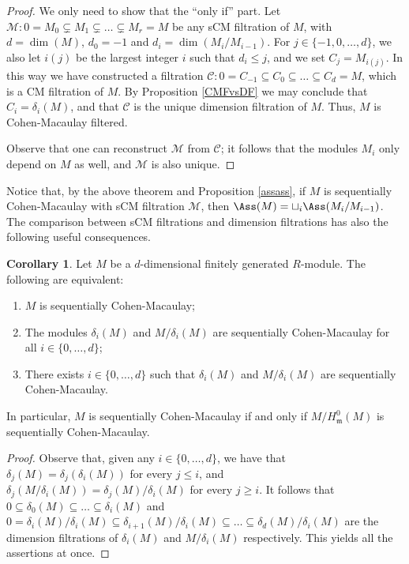 \documentclass[12pt]{amsart}
\theoremstyle{definition}
\newtheorem{corollary}[theorem]{Corollary}
\theoremstyle{definition}
\def\frk{\mathfrak}               %
\def\mm{{\frk m}}
\renewcommand{\leq}{\leqslant}
\renewcommand{\geq}{\geqslant}
\begin{document}
\begin{proof}
 We only need to show that the ``only if'' part.
   Let $\mathcal{M}: 0 = M_0 \subsetneq M_1 \subsetneq \ldots \subsetneq M_r=M$ be any sCM filtration of $M$, with $d=\dim(M)$, $d_0=-1$ and $d_i = \dim(M_i/M_{i-1})$. For $j \in \{-1, 0,\ldots, d\}$,  we also let $i(j)$ be the largest integer $i$ such that $d_{i} \leq j$, and we set $C_j=M_{i(j)}$. In this way we have constructed a filtration  $\mathcal{C}:0=C_{-1} \subseteq C_0 \subseteq \ldots \subseteq C_d=M$, which  is a CM filtration of $M$. By Proposition \ref{CMFvsDF} we may conclude that $C_i = \delta_i(M)$, and that $\mathcal{C}$ is the unique dimension filtration of $M$. Thus,  $M$ is Cohen-Macaulay filtered.

Observe that  one can reconstruct $\mathcal{M}$ from  $\mathcal{C}$; it follows that the modules $M_i$ only depend on $M$ as well, and $\mathcal{M}$ is also unique.
\end{proof}

\noindent Notice that, by the above theorem and  Proposition \ref{assass}, if $M$ is sequentially Cohen-Macaulay with sCM filtration $\mathcal{M}$, then $\Ass(M)=\sqcup_i \Ass(M_i/M_{i-1})$.  The comparison between sCM filtrations and dimension filtrations has also the following useful consequences. 

\begin{corollary} \label{coroll H0}
Let $M$ be a $d$-dimensional finitely generated $R$-module. The following are equivalent:
\begin{enumerate}[(1)]
\item $M$ is sequentially Cohen-Macaulay;
\item The modules $\delta_i(M)$ and $M/\delta_i(M)$ are sequentially Cohen-Macaulay for all $i \in \{0,\ldots,d\}$;
\item There exists $i \in \{0,\ldots,d\}$ such that $\delta_i(M)$ and $M/\delta_i(M)$ are sequentially Cohen-Macaulay.
\end{enumerate}

In particular,  $M$ is sequentially Cohen-Macaulay if and only if $M/H^0_\mm(M)$ is sequentially Cohen-Macaulay. 
\end{corollary}
\begin{proof}
Observe that, given  any $i \in \{0,\ldots,d\}$,  we have that $\delta_j(M) = \delta_j(\delta_i(M))$ for every $j \leq i$, and $\delta_j(M/\delta_i(M)) = \delta_j(M)/\delta_i(M)$ for every $j \geq i$. It follows that $0 \subseteq \delta_0(M) \subseteq \ldots \subseteq \delta_i(M)$ and $0 = \delta_i(M)/\delta_i(M) \subseteq \delta_{i+1}(M)/\delta_i(M) \subseteq \ldots \subseteq \delta_d(M)/\delta_i(M)$ are the dimension filtrations of $\delta_i(M)$ and $M/\delta_i(M)$ respectively. This yields all the assertions at once.
\end{proof}
\end{document}
